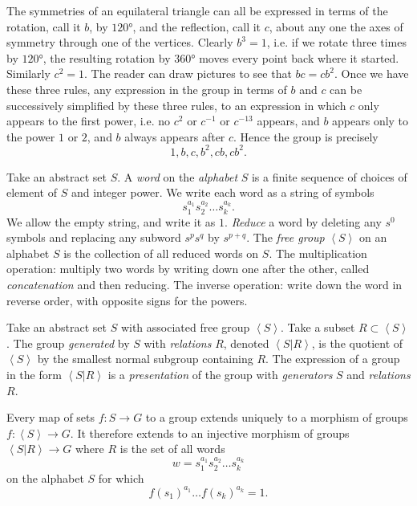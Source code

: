 \begin{example}
The symmetries of an equilateral triangle can all be expressed in terms of the rotation, call it \(b\), by \(120\si{\degree}\), and the reflection, call it \(c\), about any one the axes of symmetry through one of the vertices.
Clearly \(b^3=1\), i.e. if we rotate three times by \(120\si{\degree}\), the resulting rotation by \(360\si{\degree}\) moves every point back where it started.
Similarly \(c^2=1\).
The reader can draw pictures to see that \(bc=cb^2\).
Once we have these three rules, any expression in the group in terms of \(b\) and \(c\) can be successively simplified by these three rules, to an expression in which \(c\) only appears to the first power, i.e. no \(c^2\) or \(c^{-1}\) or \(c^{-13}\) appears, and \(b\) appears only to the power \(1\) or \(2\), and \(b\) always appears after \(c\).
Hence the group is precisely
\[
1,b,c,b^2,cb,cb^2.
\]
\end{example}


Take an abstract set \(S\).
A \emph{word} on the \emph{alphabet} \(S\) is a finite sequence of choices of element of \(S\) and integer power.
We write each word as a string of symbols
\[
s_1^{a_1} s_2^{a_2} \dots s_k^{a_k}.
\]
We allow the empty string, and write it as \(1\).
\emph{Reduce} a word by deleting any \(s^0\) symbols and replacing any subword \(s^p s^q\) by \(s^{p+q}\).
The \emph{free group} \(\left<S\right>\) on an alphabet \(S\) is the collection of all reduced words on \(S\).
The multiplication operation: multiply two words by writing down one after the other, called \emph{concatenation} and then reducing.
The inverse operation: write down the word in reverse order, with opposite signs for the powers.

Take an abstract set \(S\) with associated free group \(\left<S\right>\).
Take a subset \(R \subset \left<S\right>\).
The group \emph{generated} by \(S\) with \emph{relations} \(R\), denoted \(\left<S|R\right>\), is the quotient of \(\left<S\right>\) by the smallest normal subgroup containing \(R\).
The expression of a group in the form \(\left<S|R\right>\) is a \emph{presentation} of the group with \emph{generators} \(S\) and \emph{relations} \(R\).

\begin{lemma}
Every map of sets \(f \colon S \to G\) to a group extends uniquely to a morphism of groups \(f \colon \left<S\right> \to G\).
It therefore extends to an injective morphism of groups \(\left<S|R\right> \to G\) where \(R\) is the set of all words 
\[
w=s_1^{a_1} s_2^{a_2} \dots s_k^{a_k}
\]
on the alphabet \(S\) for which
\[
f(s_1)^{a_1} \dots f(s_k)^{a_k} = 1.
\]
\end{lemma}

